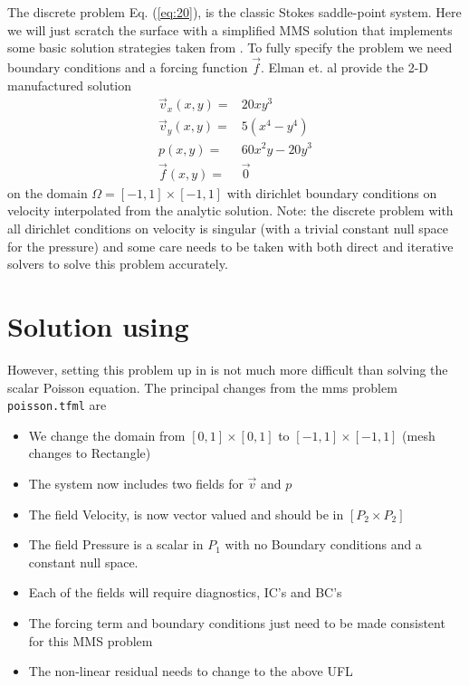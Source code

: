 The discrete problem Eq. (\ref{eq:20}),  is the classic Stokes
saddle-point system.  Here we will just scratch the
surface with a simplified MMS solution that implements some basic solution
strategies taken from \cite{elman_finite_2005}.  To fully specify the
problem we need boundary conditions and a forcing function $\vec{f}$. Elman et. al \cite{elman_finite_2005} provide  the
2-D manufactured solution 
\begin{align}
  \vec{v}_{x}(x,y) =& 20xy^{3} \nonumber \\
  \vec{v}_{y}(x,y) =& 5(x^{4} - y^{4})  \label{eq:stokes-mms}
\\
   p(x,y) =& 60x^{2}y - 20y^{3} \nonumber \\
   \vec{f}(x,y) =& \vec{0} \nonumber 
\end{align}
on the domain  $\Omega=[-1,1]\times[-1,1]$ with dirichlet boundary conditions on velocity interpolated from the
analytic solution.  Note: the discrete problem with all dirichlet
conditions on velocity is singular (with a trivial constant null space
for the pressure) and some care needs to be taken with both direct and
iterative solvers to solve this problem accurately.

\section{Solution using \TF}
\label{sec:solution-using-tf}

However, setting this problem up in \TF{} is not
much more difficult than solving the scalar Poisson equation.  The
principal changes from the mms problem \texttt{poisson.tfml} are
\begin{itemize}
\setlength{\itemsep}{0em}
\item We  change the domain from $[0,1]\times[0,1]$ to
  $[-1,1]\times[-1,1]$ (mesh changes to Rectangle)
\item The system now includes two fields for $\vec{v}$ and $p$
\item The field Velocity, is now vector valued and should be in
  $[P_{2}\times P_{2}]$
\item The field Pressure is a scalar in $P_{1}$ with no Boundary
  conditions and a constant null space.
\item Each of the fields will require diagnostics, IC's and BC's
\item The forcing term and boundary conditions just need to be made
  consistent for this MMS problem
\item The non-linear residual needs to change to the above UFL
\end{itemize}

